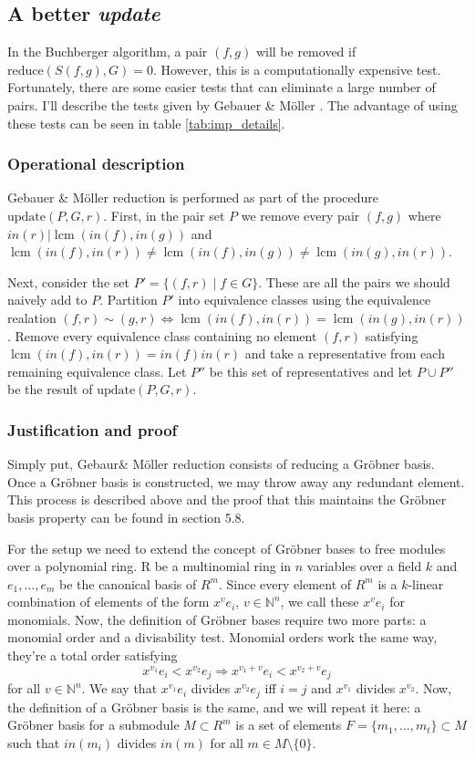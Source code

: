 \documentclass{article}
\theoremstyle{changedot}
\theoremstyle{changedotbreak}
\theoremstyle{nonumberplain}
\newcommand{\m}{\mathbb}
\DeclareMathOperator{\lcm}{lcm}
\begin{document}
\subsection{A better \emph{update}}  \label{sec:update}
In the Buchberger algorithm, a pair $(f, g)$ will be removed if $\text{reduce}(S(f, g), G) = 0$. However, this is a computationally expensive test. Fortunately, there are some easier tests that can eliminate a large number of pairs. I'll describe the tests given by Gebauer \& Möller \cite{GM}. The advantage of using these tests can be seen in table \ref{tab:imp_details}.

\subsubsection{Operational description}
Gebauer \& Möller reduction is performed as part of the procedure $\text{update}(P, G, r)$. First, in the pair set $P$ we remove every pair $(f, g)$ where $in(r) | \lcm(in(f), in(g))$ and $\lcm(in(f), in(r)) \neq \lcm(in(f), in(g)) \neq \lcm(in(g), in(r))$.

Next, consider the set $P' = \{(f, r) \mid f \in G\}$. These are all the pairs we should naively add to $P$. Partition $P'$ into equivalence classes using the equivalence realation $(f, r) \sim (g, r) \Longleftrightarrow \lcm(in(f), in(r)) = \lcm(in(g), in(r))$. Remove every equivalence class containing no element $(f, r)$ satisfying $\lcm(in(f), in(r)) = in(f) in(r)$ and take a representative from each remaining equivalence class. Let $P''$ be this set of representatives and let $P \cup P''$ be the result of $\text{update}(P, G, r)$.


\subsubsection{Justification and proof}
Simply put, Gebaur\& Möller reduction consists of reducing a Gröbner basis. Once a Gröbner basis is constructed, we may throw away any redundant element. This process is described above and the proof that this maintains the Gröbner basis property can be found in \cite{NL} section 5.8.

For the setup we need to extend the concept of Gröbner bases to free modules over a polynomial ring. R be a multinomial ring in $n$ variables over a field $k$ and $e_{1}, \dots, e_{m}$ be the canonical basis of $R^{m}$. Since every element of $R^{m}$ is a $k$-linear combination of elements of the form $x^{v}e_{i}$, $v \in \m N^{n}$, we call these $x^{v}e_{i}$ for monomials. Now, the definition of Gröbner bases require two more parts: a monomial order and a divisability test. Monomial orders work the same way, they're a total order satisfying \[x^{v_{1}}e_i < x^{v_{2}}e_{j} \Longrightarrow x^{v_{1} + v} e_{i} < x^{v_{2} + v} e_{j}\] for all $v \in \m N^{n}$. We say that $x^{v_{1}}e_{i}$ divides $x^{v_{2}}e_{j}$ iff $i=j$ and $x^{v_{1}}$ divides $x^{v_{2}}$. Now, the definition of a Gröbner basis is the same, and we will repeat it here: a Gröbner basis for a submodule $M \subset R^{m}$ is a set of elements $F = \{m_{1}, \dots, m_{t}\} \subset M$ such that $in(m_{i})$ divides $in(m)$ for all $m \in M \setminus \{0\}$.
\end{document}
